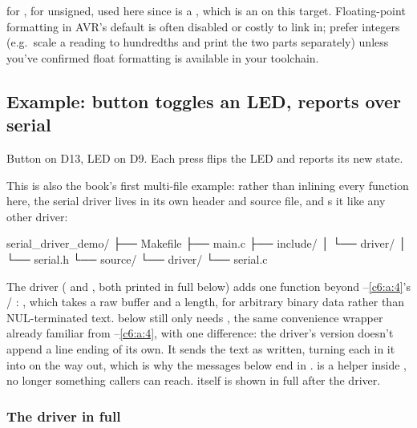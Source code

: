 \noindent{} for ,  for unsigned,  used here since
 is a , which is an  on this target.
Floating-point formatting in AVR's default  is often disabled or costly to link
in; prefer integers (e.g.\ scale a reading to hundredths and print the two parts separately)
unless you've confirmed float formatting is available in your toolchain.

\subsection{Example: button toggles an LED, reports over serial}
\label{c6:a:6}
Button on D13, LED on D9. Each press flips the LED and reports its new state.


This is also the book's first multi-file example: rather than inlining every function here, the
serial driver lives in its own header and source file, and  s it like
any other driver:

\begin{console}
serial_driver_demo/
├── Makefile
├── main.c
├── include/
│   └── driver/
│       └── serial.h
└── source/
    └── driver/
        └── serial.c
\end{console}

\noindent The driver ( and , both printed in full
below) adds one function beyond --\ref{c6:a:4}'s /%
: , which takes a raw  buffer and a
length, for arbitrary binary data rather than NUL-terminated text.  below still only
needs , the same convenience wrapper already familiar from
--\ref{c6:a:4}, with one difference: the driver's version doesn't append a line
ending of its own. It sends the text as written, turning each \code{\n} in it into \code{\r\n} on
the way out, which is why the messages below end in \code{\n}.  is a
 helper inside , no longer something callers can reach. 
itself is shown in full after the driver.

\subsubsection{The driver in full}

